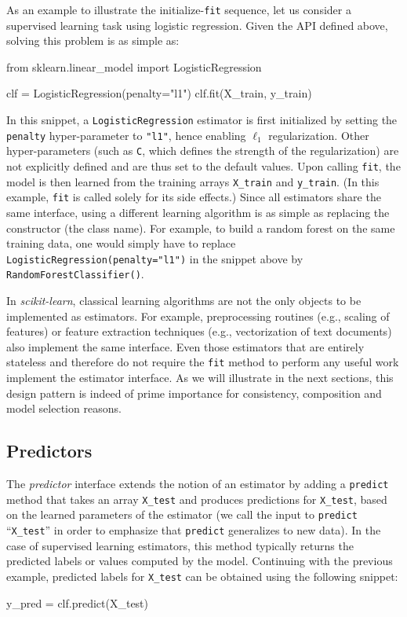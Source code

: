 \documentclass{llncs}
\newcommand{\sklearn}{\textit{scikit-learn}\xspace}
\begin{document}
As an example to illustrate the initialize-\texttt{fit} sequence,
let us consider a supervised learning task using logistic regression.
Given the API defined above, solving this problem is as simple as:
\begin{pythoncode}
from sklearn.linear_model import LogisticRegression

clf = LogisticRegression(penalty="l1")
clf.fit(X_train, y_train)
\end{pythoncode}
In this snippet, a \texttt{LogisticRegression} estimator is first initialized by
setting the \texttt{penalty} hyper-parameter to \texttt{"l1"}, hence enabling
$\ell_1$ regularization. Other hyper-parameters (such as \texttt{C}, which
defines the strength of the regularization) are not explicitly defined and are
thus set to the default values. Upon calling \texttt{fit}, the model is then
learned from the training arrays \texttt{X\_train} and \texttt{y\_train}.
(In this example, \texttt{fit} is called solely for its side effects.)
Since all estimators share the same interface, using a different learning algorithm is
as simple as replacing the constructor (the class name).
For example, to build a random forest on
the same training data, one would simply have to replace
\texttt{LogisticRegression(penalty="l1")} in the snippet above by \\
\texttt{RandomForestClassifier()}.

In \sklearn, classical learning algorithms are not the only objects to be
implemented as estimators. For example, preprocessing routines (e.g., scaling of
features) or feature extraction techniques (e.g., vectorization of text
documents) also implement the same interface. Even those estimators that are
entirely stateless and therefore do not require the \texttt{fit} method to
perform any useful work implement the estimator interface. As we will illustrate
in the next sections, this design pattern is indeed of prime importance for
consistency, composition and model selection reasons.

\subsection{Predictors}

The \textit{predictor} interface extends the notion of an estimator
by adding a \texttt{predict}
method that takes an array \texttt{X\_test} and produces
predictions for \texttt{X\_test}, based on the learned parameters of the
estimator (we call the input to \texttt{predict} ``\texttt{X\_test}'' in order
to emphasize that \texttt{predict} generalizes to new data). In the case of
supervised learning estimators, this method typically returns the predicted
labels or values computed by the model.  Continuing with the previous example,
predicted labels for \texttt{X\_test} can be obtained using the following
snippet:
\begin{pythoncode}
y_pred = clf.predict(X_test)
\end{pythoncode}
\end{document}
